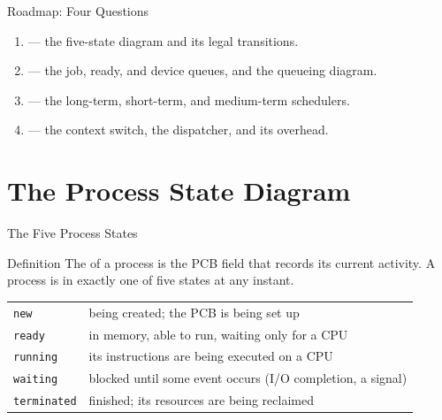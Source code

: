 \documentclass[aspectratio=169]{beamer}
\begin{document}
\begin{frame}{Roadmap: Four Questions}
  \begin{enumerate}
    \item {} --- the five-state diagram
      and its legal transitions.
    \item {} --- the job, ready, and
      device queues, and the queueing diagram.
    \item {} --- the long-term,
      short-term, and medium-term schedulers.
    \item {} --- the context switch, the
      dispatcher, and its overhead.
  \end{enumerate}
  \vspace{0.2cm}
\end{frame}


\section{The Process State Diagram}

\begin{frame}{The Five Process States}
  \begin{block}{Definition}
    The  of a process is the PCB field that records its current
    activity. A process is in exactly one of five states at any instant.
  \end{block}
  \small
  \renewcommand{\arraystretch}{1.2}
  \begin{tabular}{@{}p{}p{}@{}}
    \texttt{new} & being created; the PCB is being set up \\
    \texttt{ready} & in memory, able to run, waiting only for a CPU \\
    \texttt{running} & its instructions are being executed on a CPU \\
    \texttt{waiting} & blocked until some event occurs (I/O completion, a signal) \\
    \texttt{terminated} & finished; its resources are being reclaimed \\
  \end{tabular}
  \vspace{0.15cm}

\end{frame}
\end{document}
